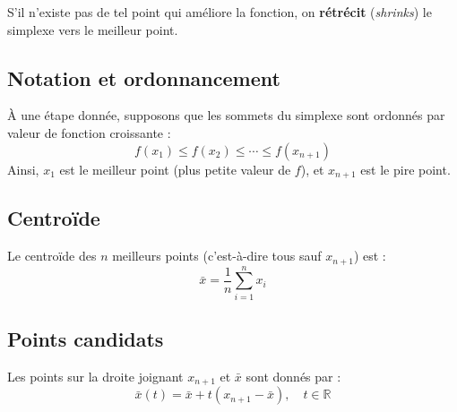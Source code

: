 S'il n'existe pas de tel point qui améliore la fonction, on \textbf{rétrécit} (\textit{shrinks}) le simplexe vers le meilleur point.

\subsection{Notation et ordonnancement}

À une étape donnée, supposons que les sommets du simplexe sont ordonnés par valeur de fonction croissante :
\begin{equation}
    f(x_1) \leq f(x_2) \leq \cdots \leq f(x_{n+1})
\end{equation}
Ainsi, $x_1$ est le meilleur point (plus petite valeur de $f$), et $x_{n+1}$ est le pire point.

\subsection{Centroïde}

Le centroïde des $n$ meilleurs points (c'est-à-dire tous sauf $x_{n+1}$) est :
\begin{equation}
    \bar{x} = \frac{1}{n} \sum_{i=1}^{n} x_i
\end{equation}

\subsection{Points candidats}

Les points sur la droite joignant $x_{n+1}$ et $\bar{x}$ sont donnés par :
\begin{equation}
    \bar{x}(t) = \bar{x} + t(x_{n+1} - \bar{x}), \quad t \in \mathbb{R}
\end{equation}

